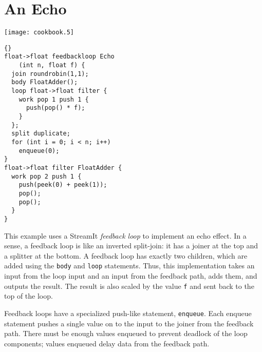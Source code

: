 \section{An Echo}

\begin{textpic}{\texttt{[image: cookbook.5]}}
\begin{lstlisting}{}
float->float feedbackloop Echo
    (int n, float f) {
  join roundrobin(1,1);
  body FloatAdder();
  loop float->float filter {
    work pop 1 push 1 {
      push(pop() * f);
    }
  };
  split duplicate;
  for (int i = 0; i < n; i++)
    enqueue(0);
}
float->float filter FloatAdder {
  work pop 2 push 1 {
    push(peek(0) + peek(1));
    pop();
    pop();
  }
}
\end{lstlisting}
\end{textpic}

This example uses a StreamIt \emph{feedback loop} to implement an echo
effect.  In a sense, a feedback loop is like an inverted split-join:
it has a joiner at the top and a splitter at the bottom.  A feedback
loop has exactly two children, which are added using the \lstinline|body|
and \lstinline|loop| statements.  Thus, this implementation takes an
input from the loop input and an input from the feedback path, adds
them, and outputs the result.  The result is also scaled by the value
\lstinline|f| and sent back to the top of the loop.

Feedback loops have a specialized push-like statement,
\lstinline|enqueue|.  Each enqueue statement pushes a single value on
to the input to the joiner from the feedback path.  There must be
enough values enqueued to prevent deadlock of the loop components;
values enqueued delay data from the feedback path.

